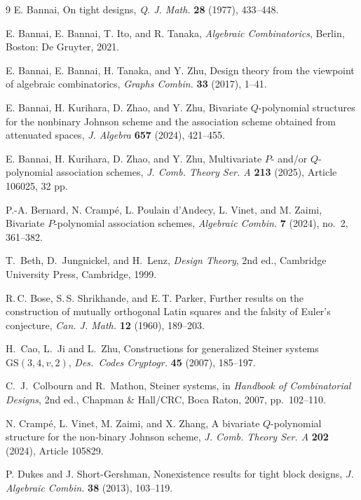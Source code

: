 \documentclass[a4paper, 11pt]{article}
\theoremstyle{definition}
\begin{document}
\begin{thebibliography}{9}
E. Bannai, On tight designs, {\it Q. J. Math.} \textbf{28} (1977), 433--448.

E. Bannai, E. Bannai, T. Ito, and R. Tanaka,
{\it Algebraic Combinatorics}, Berlin, Boston: De Gruyter, 2021.

E. Bannai, E. Bannai, H. Tanaka, and Y. Zhu,
Design theory from the viewpoint of algebraic combinatorics,
{\it Graphs Combin.} \textbf{33} (2017), 1--41.

E. Bannai, H. Kurihara, D. Zhao, and Y. Zhu,
Bivariate $Q$-polynomial structures for the nonbinary Johnson scheme and the association scheme obtained from attenuated spaces,
{\it J. Algebra} \textbf{657} (2024), 421--455.

E. Bannai, H. Kurihara, D. Zhao, and Y. Zhu,
Multivariate $P$- and/or $Q$-polynomial association schemes,
{\it J. Comb. Theory Ser. A} \textbf{213} (2025), Article 106025, 32 pp.

P.-A. Bernard, N. Cramp\'e, L. Poulain d'Andecy, L. Vinet, and M. Zaimi,
Bivariate $P$-polynomial association schemes,
{\it Algebraic Combin.} \textbf{7} (2024), no.~2, 361--382.


T.~Beth, D.~Jungnickel, and H.~Lenz,
{\it Design Theory}, 2nd ed.,
Cambridge University Press, Cambridge, 1999.



R.\,C. Bose, S.\,S. Shrikhande, and E.\,T. Parker,
Further results on the construction of mutually orthogonal Latin squares and the falsity of Euler's conjecture,
{\it Can. J. Math.} \textbf{12} (1960), 189--203. 


H.~Cao, L.~Ji and L.~Zhu,
Constructions for generalized Steiner systems $\mathrm{GS}(3,4,v,2)$,
{\it Des.\ Codes Cryptogr.} \textbf{45} (2007), 185--197.

C.~J.~Colbourn and R.~Mathon,
Steiner systems,
in {\it Handbook of Combinatorial Designs}, 2nd ed.,
Chapman \& Hall/CRC, Boca Raton, 2007, pp.~102--110.

N. Cramp\'e, L. Vinet, M. Zaimi, and X. Zhang,
A bivariate $Q$-polynomial structure for the non-binary Johnson scheme,
{\it J. Comb. Theory Ser. A} \textbf{202} (2024), Article 105829.

P. Dukes and J. Short-Gershman, Nonexistence results for tight block designs, {\it J. Algebraic Combin.} \textbf{38} (2013), 103--119.


\end{thebibliography}
\end{document}
